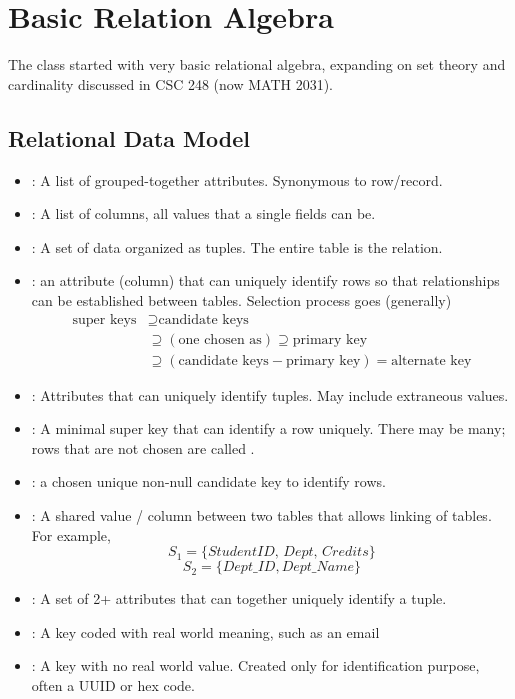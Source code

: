 
\section{Basic Relation Algebra}

The class started with very basic relational algebra, expanding on set theory and cardinality discussed in CSC 248 (now MATH 2031).
 
\subsection{Relational Data Model}

\begin{itemize}
    \item {}: A list of grouped-together attributes. Synonymous to row/record. 
    \item {}: A list of columns, all values that a single fields can be. 
    \item {}: A set of data organized as tuples. The entire table is the relation.
    \item {}: an attribute (column) that can uniquely identify rows so that relationships can be established between tables. Selection process goes (generally)
    \[
    \begin{aligned}
    \text{super keys} &\supseteq \text{candidate keys} \\
    &\supseteq (\text{one chosen as}) \supseteq \text{primary key} \\
    &\supseteq (\text{candidate keys} - \text{primary key}) = \text{alternate key}
    \end{aligned}
    \]
    \item {}: Attributes that can uniquely identify tuples. May include extraneous values.
    \item {}: A minimal super key that can identify a row uniquely. There may be many; rows that are not chosen are called .
    \item {}: a chosen unique non-null candidate key to identify rows.
    \item {}: A shared value / column between two tables that allows linking of tables. For example, 
    \[S_1=\{StudentID, \,Dept, \, Credits\}\] \[S_{2}= \{Dept\_{ID}, Dept\_Name\}\]
    \item {}: A set of 2+ attributes that can together uniquely identify a tuple.
    \item {}: A key coded with real world meaning, such as an email
    \item {}: A key with no real world value. Created only for identification purpose, often a UUID or hex code.
\end{itemize}

